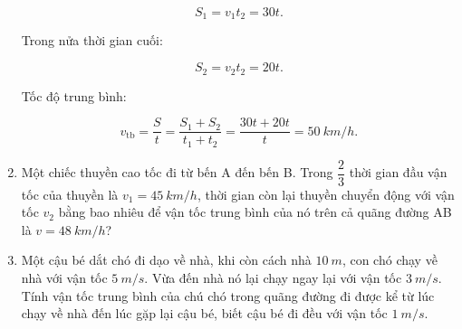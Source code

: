 \begin{enumerate}[label=\bfseries Câu \arabic*:]
{		$$S_1 = v_1t_2 = 30t.$$
		
		Trong nửa thời gian cuối:
		
		$$S_2 = v_2t_2 = 20t.$$
		
		Tốc độ trung bình:
		
		$$v_\text{tb} = \dfrac{S}{t} = \dfrac{S_1 + S_2}{t_1+t_2} = \dfrac{30t + 20t}{t} = \SI{50}{km/h}.$$		
	}
	\item {}
	
	{
		
		Một chiếc thuyền cao tốc đi từ bến A đến bến B. Trong $\dfrac{2}{3}$ thời gian đầu vận tốc của thuyền là $v_1 = \SI{45}{km/h}$, thời gian còn lại thuyền chuyển động với vận tốc $v_2$ bằng bao nhiêu để vận tốc trung bình của nó trên cả quãng đường AB là $v = \SI{48}{km/h}$?
		
	}
	\item {}
	
	{
		Một cậu bé dắt chó đi dạo về nhà, khi còn cách nhà $\SI{10}{m}$, con chó chạy về nhà với vận tốc $\SI{5}{m/s}$. Vừa đến nhà nó lại chạy ngay lại với vận tốc $\SI{3}{m/s}$. Tính vận tốc trung bình của chú chó trong quãng đường đi được kể từ lúc chạy về nhà đến lúc gặp lại cậu bé, biết cậu bé đi đều với vận tốc $\SI{1}{m/s}$.
	}
\end{enumerate}
